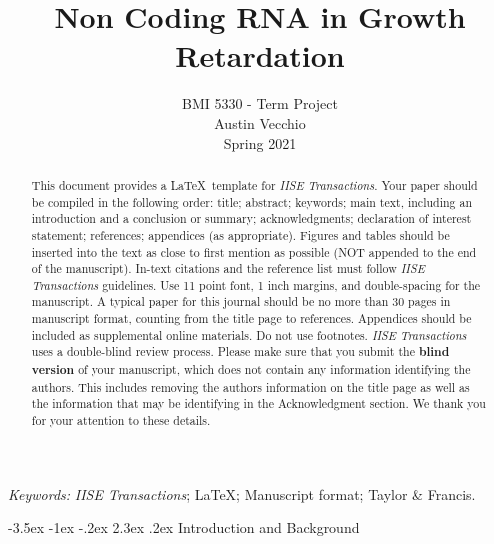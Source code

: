 \documentclass[11pt]{article}
\makeatletter
\renewcommand\section{\@startsection {section}{1}{\z@}%
                                       {-3.5ex \@plus -1ex \@minus -.2ex}%
                                       {2.3ex \@plus.2ex}%
                                       {\normalfont\fontfamily{phv}\fontsize{16}{19}\bfseries}}
\makeatother
\begin{document}
		
		\def\spacingset#1{\renewcommand{\baselinestretch}%
			{#1}\small\normalsize} \spacingset{1}
		
    \title{Non Coding RNA in Growth Retardation}
    \author{BMI 5330 - Term Project \\
    Austin Vecchio \\
    Spring 2021 }
    \date{}
    \maketitle
		
		
	\begin{abstract}
This document provides a \LaTeX \ template for \emph{IISE Transactions}. Your paper should be compiled in the following order: title; abstract; keywords; main text, including an introduction and a conclusion or summary; acknowledgments; declaration of interest statement; references; appendices (as appropriate). Figures and tables should be inserted into the text as close to first mention as possible (NOT appended to the end of the manuscript). In-text citations and the reference list must follow \emph{IISE Transactions} guidelines. Use 11 point font, 1 inch margins, and double-spacing for the manuscript. A typical paper for this journal should be no more than 30 pages in manuscript format, counting from the title page to references. Appendices should be included as supplemental online materials. Do not use footnotes. \emph{IISE Transactions} uses a double-blind review process. Please make sure that you submit the \textbf{blind version} of your manuscript, which does not contain any information identifying the authors.  This includes removing the authors information on the title page as well as the information that may be identifying in the Acknowledgment section. We thank you for your attention to these details.
	\end{abstract}
			
	\noindent%
	{\it Keywords:} \emph{IISE Transactions}; \LaTeX; Manuscript format; Taylor \& Francis.

	\spacingset{1.5} %


\section{Introduction and Background} \label{s:intro}
\end{document}
